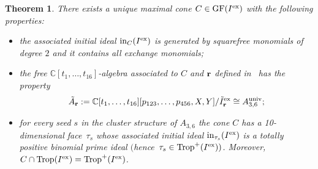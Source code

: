 \documentclass[pdftex]{sigma}%
\newtheorem{Theorem}{Theorem}[section]
\numberwithin{equation}{section}
\DeclareMathOperator{\init}{in}
\DeclareMathOperator{\GF}{GF}
\DeclareMathOperator{\trop}{Trop}
\begin{document}
\begin{Theorem}
There exists a unique maximal cone $C\in\GF(I^{\rm ex})$ with the following properties:
\begin{itemize}\itemsep=0pt
 \item[$(i)$] the associated initial ideal $\init_C(I^{\rm ex})$ is generated by squarefree monomials of degree $2$ and it contains all exchange monomials;
\item[$(ii)$] the free $\mathbb C[t_1,\dots,t_{16}]$-algebra associated to $C$ and $\bf r$ defined in~ has the pro\-perty
 \[
 \tilde A_{\bf r}:=\mathbb C[t_1,\dots,t_{16}][p_{123}, \dots , p_{456}, X,Y]/\tilde I^{\rm ex}_{\bf r} \cong A_{3,6}^{\rm univ};
 \]
\item[$(iii)$] for every seed $s$ in the cluster structure of $A_{3,6}$ the cone $C$ has a 10-dimensional face~$\tau_s$ whose associated initial ideal $\init_{\tau_s}(I^{\rm ex})$ is a totally positive binomial prime ideal $($hence~$\tau_s\in \trop^+(I^{\rm ex}))$.
 Moreover, $C\cap \trop(I^{\rm ex})=\trop^+(I^{\rm ex})$.
\end{itemize}
\end{Theorem}
\end{document}
